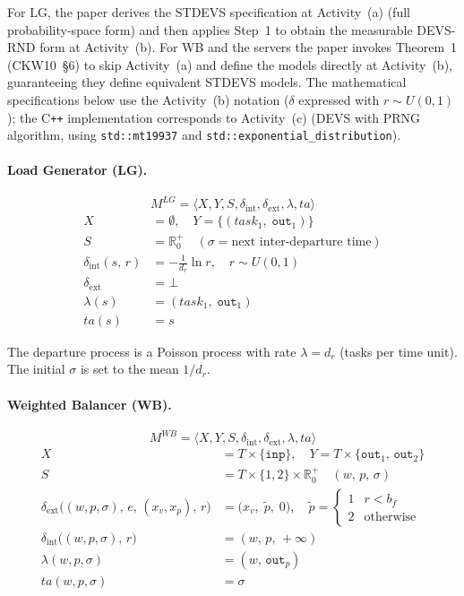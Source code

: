 For LG, the paper derives the STDEVS specification at Activity~(a)
(full probability-space form) and then applies Step~1 to obtain the
measurable DEVS-RND form at Activity~(b).
For WB and the servers the paper invokes Theorem~1 (CKW10~§6) to
skip Activity~(a) and define the models directly at Activity~(b),
guaranteeing they define equivalent STDEVS models.
The mathematical specifications below use the Activity~(b) notation
($\delta$ expressed with $r\sim U(0,1)$); the C\texttt{++}
implementation corresponds to Activity~(c) (DEVS with PRNG algorithm,
using \texttt{std::mt19937} and \texttt{std::exponential\_distribution}).

\paragraph{Load Generator (LG).}

\[
  M^{LG} = \langle X, Y, S, \delta_{\mathrm{int}}, \delta_{\mathrm{ext}},
              \lambda, ta \rangle
\]
\begin{align*}
  X &= \emptyset, \quad Y = \{(\mathit{task}_1,\;\texttt{out}_1)\} \\
  S &= \mathbb{R}^+_0 \quad (\sigma = \text{next inter-departure time}) \\
  \delta_{\mathrm{int}}(s,\,r) &= -\tfrac{1}{d_r}\ln r, \quad r \sim U(0,1) \\
  \delta_{\mathrm{ext}} &= \bot \\
  \lambda(s) &= (\mathit{task}_1,\;\texttt{out}_1) \\
  ta(s) &= s
\end{align*}

The departure process is a Poisson process with rate $\lambda = d_r$ (tasks
per time unit).  The initial $\sigma$ is set to the mean $1/d_r$.

\paragraph{Weighted Balancer (WB).}

\[
  M^{WB} = \langle X, Y, S, \delta_{\mathrm{int}}, \delta_{\mathrm{ext}},
               \lambda, ta \rangle
\]
\begin{align*}
  X &= T \times \{\texttt{inp}\}, \quad
  Y  = T \times \{\texttt{out}_1,\, \texttt{out}_2\} \\
  S &= T \times \{1,2\} \times \mathbb{R}^+_0 \quad (w,\, p,\, \sigma) \\
  \delta_{\mathrm{ext}}\!\bigl((w,p,\sigma),\,e,\,(x_v,x_p),\,r\bigr)
        &= \bigl(x_v,\;\tilde p,\;0\bigr), \quad
           \tilde p = \begin{cases}1 & r < b_f \\ 2 & \text{otherwise}\end{cases} \\
  \delta_{\mathrm{int}}\!\bigl((w,p,\sigma),\,r\bigr) &= (w,\,p,\,+\infty) \\
  \lambda(w,p,\sigma) &= (w,\,\texttt{out}_p) \\
  ta(w,p,\sigma) &= \sigma
\end{align*}

